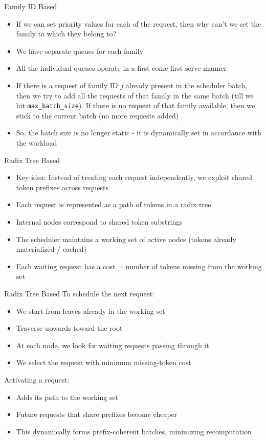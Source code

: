 \documentclass[Serif, 10pt, brown]{beamer}
\theoremstyle{example}
\theoremstyle{plain}
\begin{document}
\begin{frame}{Family ID Based}
    \begin{itemize}
        \item If we can set priority values for each of the request, then why can't we set the family to which they belong to?
        \item We have separate queues for each family
        \item All the individual queues operate in a first come first serve manner
        \item If there is a request of family ID $j$ already present in the scheduler batch, then we try to add all the requests of that family in the same batch (till we hit \texttt{max\_batch\_size}). If there is no request of that family available, then we stick to the current batch (no more requests added)
        \item So, the batch size is no longer static - it is dynamically set in accordance with the workload
    \end{itemize}
\end{frame}

\begin{frame}{Radix Tree Based}
    \begin{itemize}
        \item Key idea: Instead of treating each request independently, we exploit shared token prefixes across requests
        \item Each request is represented as a path of tokens in a radix tree
        \item Internal nodes correspond to shared token substrings 
        \item The scheduler maintains a working set of active nodes (tokens already materialized / cached)
        \item Each waiting request has a cost = number of tokens missing from the working set
    \end{itemize}
\end{frame}

\begin{frame}{Radix Tree Based}
    To schedule the next request:
    \begin{itemize}
        \item We start from leaves already in the working set
        \item Traverse upwards toward the root
        \item At each node, we look for waiting requests passing through it
        \item We select the request with minimum missing-token cost
    \end{itemize}
    Activating a request:
    \begin{itemize}
        \item Adds its path to the working set
        \item Future requests that share prefixes become cheaper
        \item This dynamically forms prefix-coherent batches, minimizing recomputation
    \end{itemize}
\end{frame}
\end{document}
